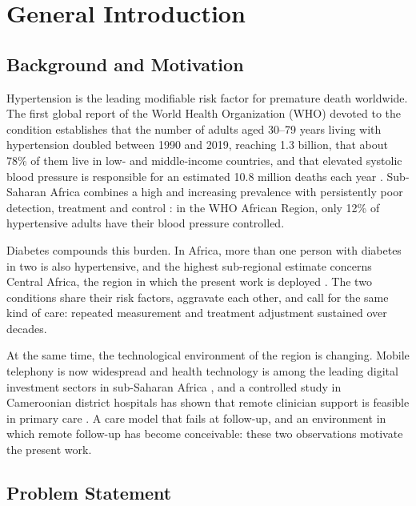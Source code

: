 \chapter{General Introduction}\label{ch:intro}

\section{Background and Motivation}\label{sec:intro-background}

Hypertension is the leading modifiable risk factor for premature death worldwide. The first global report of the World Health Organization (WHO) devoted to the condition establishes that the number of adults aged 30--79 years living with hypertension doubled between 1990 and 2019, reaching 1.3 billion, that about 78\% of them live in low- and middle-income countries, and that elevated systolic blood pressure is responsible for an estimated 10.8 million deaths each year \parencite{who2023hypertension}. Sub-Saharan Africa combines a high and increasing prevalence with persistently poor detection, treatment and control \parencite{gafane2024}: in the WHO African Region, only 12\% of hypertensive adults have their blood pressure controlled.

Diabetes compounds this burden. In Africa, more than one person with diabetes in two is also hypertensive, and the highest sub-regional estimate concerns Central Africa, the region in which the present work is deployed \parencite{hinneh2023}. The two conditions share their risk factors, aggravate each other, and call for the same kind of care: repeated measurement and treatment adjustment sustained over decades.

At the same time, the technological environment of the region is changing. Mobile telephony is now widespread and health technology is among the leading digital investment sectors in sub-Saharan Africa \parencite{segun2025}, and a controlled study in Cameroonian district hospitals has shown that remote clinician support is feasible in primary care \parencite{bediang2021}. A care model that fails at follow-up, and an environment in which remote follow-up has become conceivable: these two observations motivate the present work.

\section{Problem Statement}\label{sec:intro-problem}\label{sec:scope-problem}

